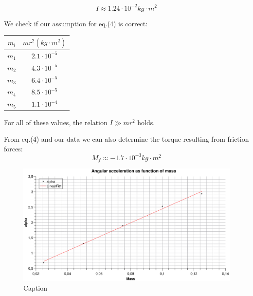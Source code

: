 \documentclass{scrartcl}
\begin{document}
    \begin{equation}
        \boxed {I \approx 1.24 \cdot 10^{-2} kg \cdot m^2}
    \end{equation}    
    
    We check if our assumption for eq.(4) is correct:
    
    \medskip
    
    \centering
    \begin{tabular}{|c|c|}
        \hline
        $m_i$ & $mr^2 (kg \cdot m^2)$ \\
        \hline
        $m_1$ & $2.1 \cdot 10^{-5}$ \\
        $m_2$ & $4.3 \cdot 10^{-5}$ \\
        $m_3$ & $6.4 \cdot 10^{-5}$ \\
        $m_4$ & $8.5 \cdot 10^{-5}$ \\
        $m_5$ & $1.1 \cdot 10^{-4}$ \\
        \hline
    \end{tabular}

    
    \flushleft
    
    \medskip
    
    For all of these values, the relation $I \gg mr^2$ holds.
    
    \medskip
    
    From eq.(4) and our data we can also determine the torque resulting from friction forces:
    \begin{equation}
        \boxed{M_f \approx -1.7 \cdot 10^{-3} kg \cdot m^2}
    \end{equation}
    
    
    
    \begin{figure}
        \centering
        \includegraphics[width=14cm]{AlphaFunctionOfMass.eps}
        \caption{Caption}
        \label{fig:my_label}
    \end{figure}
\end{document}
